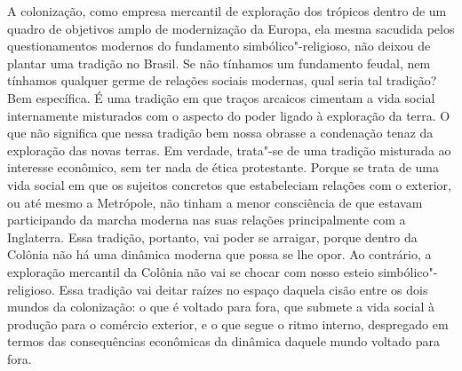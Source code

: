 A colonização, como empresa mercantil de exploração dos trópicos dentro
de um quadro de objetivos amplo de modernização da Europa, ela mesma
sacudida pelos questionamentos modernos do fundamento
simbólico"-religioso, não deixou de plantar uma tradição no Brasil. Se
não tínhamos um fundamento feudal, nem tínhamos qualquer germe de
relações sociais modernas, qual seria tal tradição? Bem específica. É
uma tradição em que traços arcaicos cimentam a vida social internamente
misturados com o aspecto do poder ligado à exploração da terra. O que
não significa que nessa tradição bem nossa obrasse a condenação tenaz da
exploração das novas terras. Em verdade, trata"-se de uma tradição
misturada ao interesse econômico, sem ter nada de ética protestante.
Porque se trata de uma vida social em que os sujeitos concretos que
estabeleciam relações com o exterior, ou até mesmo a Metrópole, não
tinham a menor consciência de que estavam participando da marcha moderna
nas suas relações principalmente com a Inglaterra. Essa tradição,
portanto, vai poder se arraigar, porque dentro da Colônia não há uma
dinâmica moderna que possa se lhe opor. Ao contrário, a exploração
mercantil da Colônia não vai se chocar com nosso esteio
simbólico"-religioso. Essa tradição vai deitar raízes no espaço daquela
cisão entre os dois mundos da colonização: o que é voltado para fora,
que submete a vida social à produção para o comércio exterior, e o que
segue o ritmo interno, despregado em termos das consequências econômicas
da dinâmica daquele mundo voltado para fora.

